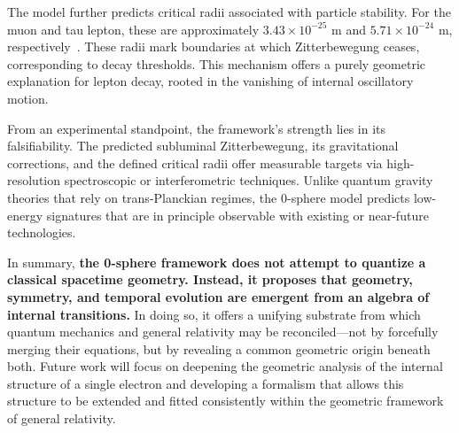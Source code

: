 \documentclass[%
 reprint,
 amsmath,amssymb,
 aps,
]{revtex4-1}
\numberwithin{equation}{section}%
\begin{document}
The model further predicts critical radii associated with particle stability. For the muon and tau lepton, these are approximately $3.43 \times 10^{-25}$ m and $5.71 \times 10^{-24}$ m, respectively~\cite{hanamura2501.0130}. These radii mark boundaries at which Zitterbewegung ceases, corresponding to decay thresholds. This mechanism offers a purely geometric explanation for lepton decay, rooted in the vanishing of internal oscillatory motion.

From an experimental standpoint, the framework's strength lies in its falsifiability. The predicted subluminal Zitterbewegung, its gravitational corrections, and the defined critical radii offer measurable targets via high-resolution spectroscopic or interferometric techniques. Unlike quantum gravity theories that rely on trans-Planckian regimes, the 0-sphere model predicts low-energy signatures that are in principle observable with existing or near-future technologies.

In summary, \textbf{the 0-sphere framework does not attempt to quantize a classical spacetime geometry. Instead, it proposes that geometry, symmetry, and temporal evolution are emergent from an algebra of internal transitions.} In doing so, it offers a unifying substrate from which quantum mechanics and general relativity may be reconciled—not by forcefully merging their equations, but by revealing a common geometric origin beneath both. Future work will focus on deepening the geometric analysis of the internal structure of a single electron and developing a formalism that allows this structure to be extended and fitted consistently within the geometric framework of general relativity.

\clearpage
\end{document}

